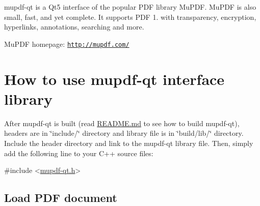 mupdf-\/qt is a Qt5 interface of the popular P\-D\-F library Mu\-P\-D\-F. Mu\-P\-D\-F is also small, fast, and yet complete. It supports P\-D\-F 1. with transparency, encryption, hyperlinks, annotations, searching and more.

Mu\-P\-D\-F homepage\-: \href{http://mupdf.com/}{\tt http\-://mupdf.\-com/}\hypertarget{index_usage}{}\section{How to use mupdf-\/qt interface library}\label{index_usage}
After mupdf-\/qt is built (read \hyperlink{_r_e_a_d_m_e_8md}{R\-E\-A\-D\-M\-E.\-md} to see how to build mupdf-\/qt), headers are in \char`\"{}include/\char`\"{} directory and library file is in \char`\"{}build/lib/\char`\"{} directory. Include the header directory and link to the mupdf-\/qt library file. Then, simply add the following line to your C++ source files\-:


\begin{DoxyCode}
\textcolor{preprocessor}{#include <\hyperlink{mupdf-qt_8h}{mupdf-qt.h}>}
\end{DoxyCode}
\hypertarget{index_document}{}\subsection{Load P\-D\-F document}\label{index_document}

